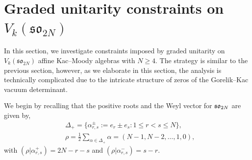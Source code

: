 \section{Graded unitarity constraints on $V_k(\mathfrak{so}_{2N})$} \label{sec:typeDgrunit}
In this section, we investigate constraints imposed by graded unitarity on $V_k(\mathfrak{so}_{2N})$ affine Kac--Moody algebras with $N \geqslant 4$. The strategy is similar to the previous section, however, as we elaborate in this section, the analysis is technically complicated due to the intricate structure of zeros of the Gorelik--Kac vacuum determinant. 

We begin by recalling that the positive roots and the Weyl vector for $\mathfrak{so}_{2N}$ are given by,
\begin{equation}
\begin{split}
    &\Delta_+ = \{\alpha^\pm_{r,s} := e_r \pm e_s: 1 \leqslant r < s \leqslant N \}, \\
    &\rho = \frac{1}{2} \sum_{\alpha \in \Delta_+} \alpha = \left(N-1, N-2, \ldots, 1,0 \right),
\end{split}
\end{equation}
with $(\rho|\alpha_{r,s}^+) = 2N - r - s$ and $(\rho|\alpha_{r,s}^-) = s - r$.

